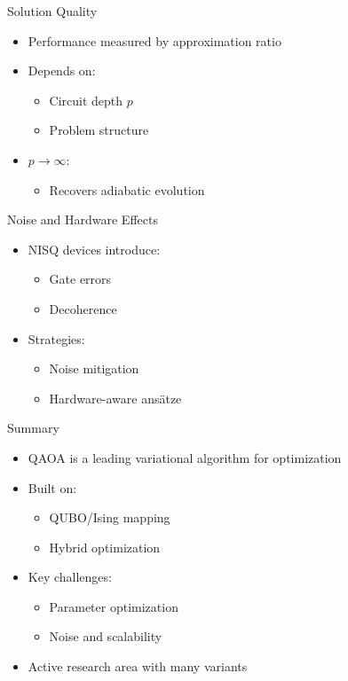 \documentclass{beamer}
\begin{document}

\begin{frame}{Solution Quality}
\begin{itemize}
\item Performance measured by approximation ratio
\item Depends on:
\begin{itemize}
\item Circuit depth $p$
\item Problem structure
\end{itemize}
\item $p \to \infty$:
\begin{itemize}
\item Recovers adiabatic evolution
\end{itemize}
\end{itemize}
\end{frame}


\begin{frame}{Noise and Hardware Effects}
\begin{itemize}
\item NISQ devices introduce:
\begin{itemize}
\item Gate errors
\item Decoherence
\end{itemize}
\item Strategies:
\begin{itemize}
\item Noise mitigation
\item Hardware-aware ansätze
\end{itemize}
\end{itemize}
\end{frame}


\begin{frame}{Summary}
\begin{itemize}
\item QAOA is a leading variational algorithm for optimization
\item Built on:
\begin{itemize}
\item QUBO/Ising mapping
\item Hybrid optimization
\end{itemize}
\item Key challenges:
\begin{itemize}
\item Parameter optimization
\item Noise and scalability
\end{itemize}
\item Active research area with many variants
\end{itemize}
\end{frame}

\end{document}
